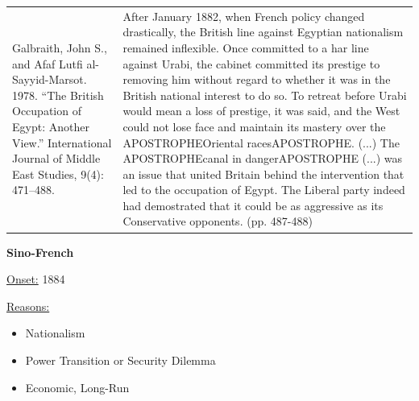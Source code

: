 {\begin{longtable}{p{}p{}}
\\
Galbraith, John S., and Afaf Lutfi al-Sayyid-Marsot. 1978. “The British Occupation of Egypt: Another View.” International Journal of Middle East Studies, 9(4): 471–488. & After January 1882, when French policy changed drastically, the British line against Egyptian nationalism remained inflexible. Once committed to a har line against Urabi, the cabinet committed its prestige to removing him without regard to whether it was in the British national interest to do so. To retreat before Urabi would mean a loss of prestige, it was said, and the West could not lose face and maintain its mastery over the APOSTROPHEOriental racesAPOSTROPHE. (...) The APOSTROPHEcanal in dangerAPOSTROPHE (...) was an issue that united Britain behind the intervention that led to the occupation of Egypt. The Liberal party indeed had demostrated that it could be as aggressive as its Conservative opponents. (pp. 487-488)
\\
\end{longtable}}
\clearpage
         \textbf{Sino-French} 

          \underline{Onset:} 1884         

\underline{Reasons:}
\begin{itemize}
\item Nationalism
\item Power Transition or Security Dilemma
\item Economic, Long-Run
\end{itemize}


